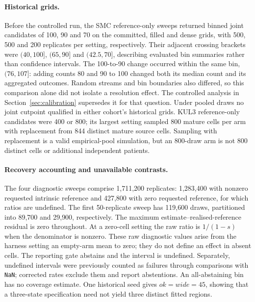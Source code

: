 \paragraph{Historical grids.}\label{app:historical}
Before the controlled run, the SMC reference-only sweeps returned binned joint
candidates of 100, 90 and 70 on the committed, filled and dense grids, with
500, 500 and 200 replicates per setting, respectively. Their adjacent crossing
brackets were $(40,100]$, $(65,90]$ and $(42.5,70]$, describing evaluated bin
summaries rather than confidence intervals. The 100-to-90 change occurred
within the same bin, $(76,107]$: adding counts 80 and 90 to 100 changed both
its median count and its aggregated outcomes. Random streams and bin boundaries
also differed, so this comparison alone did not isolate a resolution effect.
The controlled analysis in Section~\ref{sec:calibration} supersedes it for that
question. Under pooled draws no joint cutpoint qualified in either cohort's
historical grids. KUL3 reference-only candidates were 400 or 800; its largest
setting sampled 800 mature cells per arm with replacement from 844 distinct
mature source cells. Sampling with replacement is a valid empirical-pool
simulation, but an 800-draw arm is not 800 distinct cells or additional
independent patients.

\paragraph{Recovery accounting and unavailable contrasts.}\label{app:generator}
The four diagnostic sweeps comprise 1{,}711{,}200 replicates: 1{,}283{,}400 with
nonzero requested intrinsic reference and 427{,}800 with zero requested
reference, for which ratios are undefined. The first 50-replicate sweep has
119{,}600 draws, partitioned into 89{,}700 and 29{,}900, respectively. The
maximum estimate--realised-reference residual is zero throughout. At a
zero-cell setting the raw ratio is $1/(1-s)$ when the denominator is nonzero.
These raw diagnostic values arise from the harness setting an empty-arm mean
to zero; they do not define an effect in absent cells. The reporting gate
abstains and the interval is undefined. Separately, undefined intervals were
previously counted as failures through comparisons with \texttt{NaN}; corrected
rates exclude them and report abstentions. An all-abstaining bin has no
coverage estimate. One historical seed gives $ok=wide=45$, showing that a
three-state specification need not yield three distinct fitted regions.

